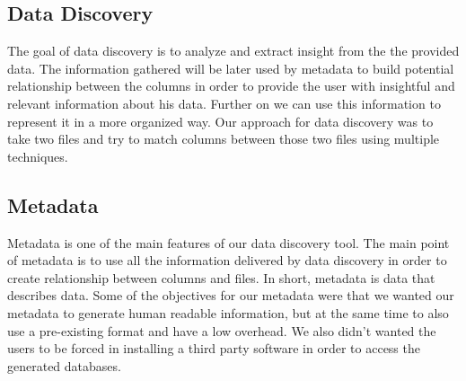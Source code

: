 \subsection{Data Discovery}
The goal of data discovery is to analyze and extract insight from the the provided data. The information gathered will be later used by metadata to build potential relationship between the columns in order to provide the user with insightful and relevant information about his data. Further on we can use this information to represent it in a more organized way. Our approach for data discovery was to take two files and try to match columns between those two files using multiple techniques.

\vspace{5mm} %
\subsection{Metadata}
Metadata is one of the main features of our data discovery tool. The main point of metadata is to use all the information delivered by data discovery in order to create relationship between columns and files. In short, metadata is data that describes data.
\newline
Some of the objectives for our metadata were that we wanted our metadata to generate human readable information, but at the same time to also use a pre-existing format and have a low overhead. We also didn't wanted the users to be forced in installing a third party software in order to access the generated databases.
\newline

\clearpage
